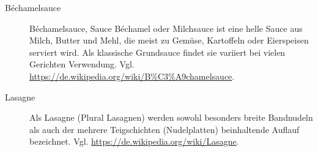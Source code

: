 \documentclass[a4paper]{article}
\begin{document}
\thispagestyle{empty}

\begin{description}
  \item [Béchamelsauce] Béchamelsauce, Sauce Béchamel oder Milchsauce ist eine helle Sauce aus Milch, Butter und Mehl, die meist zu Gemüse, Kartoffeln oder Eierspeisen serviert wird. Als klassische Grundsauce findet sie variiert bei vielen Gerichten Verwendung.  Vgl. \url{https://de.wikipedia.org/wiki/B%C3%A9chamelsauce}.
  \item [Lasagne] Als Lasagne (Plural Lasagnen) werden sowohl besonders breite Bandnudeln als auch der mehrere Teigschichten (Nudelplatten) beinhaltende Auflauf bezeichnet. Vgl. \url{https://de.wikipedia.org/wiki/Lasagne}.
\end{description}
\end{document}
